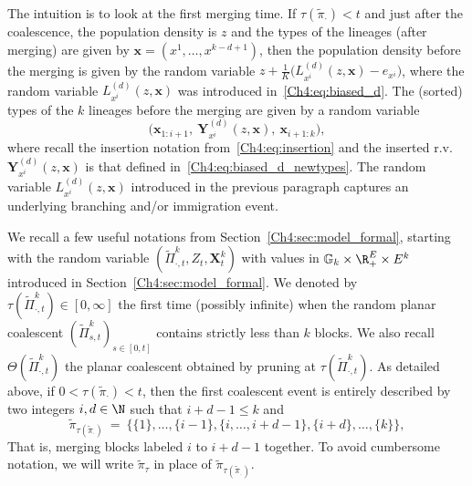 \begin{refsegment}
The intuition is to look at the first merging time.
If $\tau(\tilde\pi_\cdot)<t$ and just after the coalescence, the population density is $z$ and the types of the lineages (after merging) are given by ${\bm x}=(x^1,\ldots, x^{k-d+1})$, then the population density before the merging is given by the random variable $z+  \frac{1}{K} \big( L^{(d)}_{x^i}(z, \bm{x}) - e_{x^i} \big)$, where the random variable $L^{(d)}_{x^i}(z, \bm{x})$ was introduced in~\eqref{Ch4:eq:biased_d}. The (sorted) types of the $k$ lineages before the merging are given by a random variable 
\[ \Big(\bm x_{1:i+1},\ \bm Y^{(d)}_{x^i}(z,\bm x),\ \bm x_{i+1:k}\Big),\]
where recall the insertion notation from~\eqref{Ch4:eq:insertion} and the inserted r.v. $\bm Y^{(d)}_{x^i}(z,\bm x)$ is that defined in~\eqref{Ch4:eq:biased_d_newtypes}.
The random variable $L^{(d)}_{x^i}(z, \bm x)$ introduced in the previous paragraph captures an underlying branching and/or immigration event.


We recall a few useful notations from Section~\ref{Ch4:sec:model_formal}, starting with the random variable $(\tilde \Pi^k_{\cdot,t}, Z_t, \bm X^k_t)$ with values in $\mathbb{G}_k\times \R_+^E\times E^k $ introduced in Section~\ref{Ch4:sec:model_formal}. We denoted by $\tau(\tilde{\Pi}^k_{\cdot,t})\in [0,\infty]$ the first time (possibly infinite) when the random planar coalescent $(\tilde{\Pi}^k_{s,t})_{s\in[0,t]}$ contains strictly less than $k$ blocks. 
We also recall $\Theta(\tilde{\Pi}^k_{\cdot,t})$ the planar coalescent obtained by pruning at $\tau(\tilde{\Pi}^k_{\cdot,t})$. As detailed above, if $0<\tau(\tilde\pi_\cdot)<t$, then the first coalescent event is entirely described by two integers $i,d\in \N$ such that $i+d-1\leq k$ and 
\[ 
\tilde\pi_{\tau(\tilde\pi_\cdot)}\ =\ \big\{\{1\},\ldots,\{i-1\},\{i,\ldots, i+d-1\},\{i+d\},\ldots,\{k\}\big\}, 
 \]
 That is, merging blocks labeled $i$ to $i+d-1$ together. To avoid cumbersome notation, we will write $\tilde\pi_{\tau}$ in place of $\tilde\pi_{\tau(\tilde\pi_\cdot)}$.




\end{refsegment}
